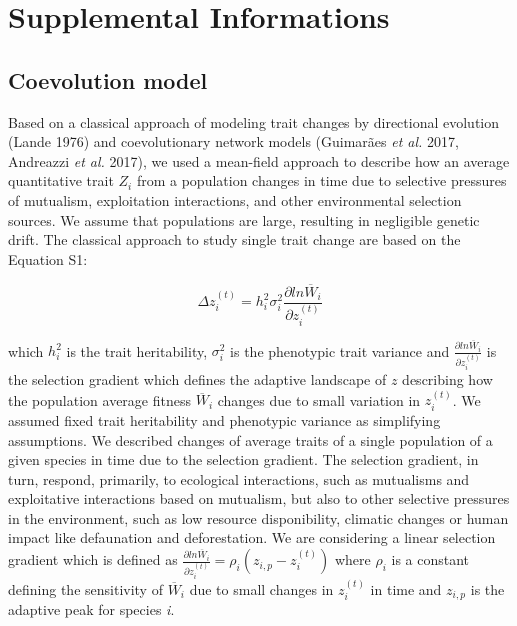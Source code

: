 \documentclass[a4paper, 12pt]{article}
\begin{document}
\section*{Supplemental Informations}

\subsection*{Coevolution model}
Based on a classical approach of modeling trait changes by directional evolution (Lande 1976) and coevolutionary network models (Guimarães \textit{et al.} 2017, Andreazzi \textit{et al.} 2017), we used a mean-field approach to describe how an average quantitative trait $Z_{i}$ from a population changes in time due to selective pressures of mutualism, exploitation interactions, and other environmental selection sources. We assume that populations are large, resulting in negligible genetic drift. The classical approach to study single trait change are based on the Equation S1:

\begin{equation}  \label{supeq:1}
  \Delta z^{(t)}_{i} = h^{2}_{i} \sigma^{2}_{i} \frac{\partial{ln \overline{W}_{i}}}{\partial z^{(t)}_{i}}
\end{equation}

which $h^{2}_{i}$ is the trait heritability, $\sigma^{2}_{i}$ is the phenotypic trait variance and $\frac{\partial{ln \overline{W}_{i}}}{\partial z^{(t)}_{i}}$ is the selection gradient which defines the adaptive landscape of $z$ describing how the population average fitness $\overline{W}_{i}$ changes due to small variation in $z^{(t)}_{i}$. We assumed fixed trait heritability and phenotypic variance as simplifying assumptions. We described changes of average traits of a single population of a given species in time due to the selection gradient. The selection gradient, in turn, respond, primarily, to ecological interactions, such as mutualisms and exploitative interactions based on mutualism, but also to other selective pressures in the environment, such as low resource disponibility, climatic changes or human impact like defaunation and deforestation. We are considering a linear selection gradient which is defined as $\frac{\partial{ln \overline{W}_{i}}}{\partial z^{(t)}_{i}} = \rho_{i}(z_{i, p} - z^{(t)}_{i})$ where $\rho_{i}$ is a constant defining the sensitivity of $\overline{W}_{i}$ due to small changes in $z^{(t)}_{i}$ in time and $z_{i, p}$ is the adaptive peak for species \textit{i}.
\end{document}
